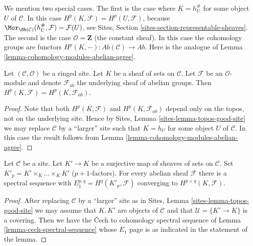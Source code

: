 \medskip\noindent
We mention two special cases. The first is the case where
$K = h_U^\#$ for some object $U$ of $\mathcal{C}$. In this case
$H^p(K, \mathcal{F}) = H^p(U, \mathcal{F})$, because
$\Mor_{\Sh(\mathcal{C})}(h_U^\#, \mathcal{F}) = \mathcal{F}(U)$, see
Sites, Section \ref{sites-section-representable-sheaves}.
The second is the case $\mathcal{O} = \mathbf{Z}$ (the constant
sheaf). In this case the cohomology groups are functors
$H^p(K, - ) : \textit{Ab}(\mathcal{C}) \to \textit{Ab}$.
Here is the analogue of
Lemma \ref{lemma-cohomology-modules-abelian-agree}.

\begin{lemma}
\label{lemma-compute-cohomology-on-sheaf-sets}
Let $(\mathcal{C}, \mathcal{O})$ be a ringed site.
Let $K$ be a sheaf of sets on $\mathcal{C}$.
Let $\mathcal{F}$ be an $\mathcal{O}$-module and denote
$\mathcal{F}_{ab}$ the underlying sheaf of abelian groups.
Then $H^p(K, \mathcal{F}) = H^p(K, \mathcal{F}_{ab})$.
\end{lemma}

\begin{proof}
Note that both $H^p(K, \mathcal{F})$ and $H^p(K, \mathcal{F}_{ab})$
depend only on the topos, not on the underlying site. Hence by
Sites, Lemma \ref{sites-lemma-topos-good-site}
we may replace $\mathcal{C}$ by a ``larger'' site such
that $K = h_U$ for some object $U$ of $\mathcal{C}$.
In this case the result follows from
Lemma \ref{lemma-cohomology-modules-abelian-agree}.
\end{proof}

\begin{lemma}
\label{lemma-cech-to-cohomology-sheaf-sets}
Let $\mathcal{C}$ be a site. Let $K' \to K$ be a surjective
map of sheaves of sets on $\mathcal{C}$. Set
$K'_p = K' \times_K \ldots \times_K K'$ ($p + 1$-factors).
For every abelian sheaf $\mathcal{F}$ there is a spectral sequence
with $E_1^{p, q} = H^q(K'_p, \mathcal{F})$ converging to
$H^{p + q}(K, \mathcal{F})$.
\end{lemma}

\begin{proof}
After replacing $\mathcal{C}$ by a ``larger'' site as in
Sites, Lemma \ref{sites-lemma-topos-good-site} 
we may assume that $K, K'$ are objects of $\mathcal{C}$ and that
$\mathcal{U} = \{K' \to K\}$ is a covering. Then we have the {\v C}ech
to cohomology spectral sequence of Lemma \ref{lemma-cech-spectral-sequence}
whose $E_1$ page is as indicated in the statement of the lemma.
\end{proof}

